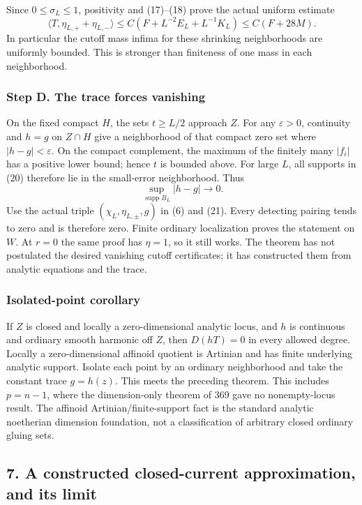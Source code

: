 \documentclass[11pt]{article}
\begin{document}
Since \(0\leq\sigma_L\leq1\), positivity and (17)--(18) prove the actual uniform estimate
\[
 \langle T,\eta_{L,+}+\eta_{L,-}\rangle
 \leq C(F+L^{-2}E_L+L^{-1}K_L)
 \leq C(F+28M).
\tag{21}
\]
In particular the cutoff mass infima for these shrinking neighborhoods are uniformly bounded. This is stronger than finiteness of one mass in each neighborhood.

\subsubsection{Step D. The trace forces vanishing}

On the fixed compact \(H\), the sets \(t\geq L/2\) approach \(Z\). For any \(\varepsilon>0\), continuity and \(h=g\) on \(Z\cap H\) give a neighborhood of that compact zero set where \(|h-g|<\varepsilon\). On the compact complement, the maximum of the finitely many \(|f_i|\) has a positive lower bound; hence \(t\) is bounded above. For large \(L\), all supports in (20) therefore lie in the small-error neighborhood. Thus
\[
 \sup_{\operatorname{supp}B_L}|h-g|\longrightarrow0.
\]
Use the actual triple \((\chi_L,\eta_{L,\pm},g)\) in (6) and (21). Every detecting pairing tends to zero and is therefore zero. Finite ordinary localization proves the statement on \(W\). At \(r=0\) the same proof has \(\eta=1\), so it still works. The theorem has not postulated the desired vanishing cutoff certificates; it has constructed them from analytic equations and the trace.

\subsubsection{Isolated-point corollary}

If \(Z\) is closed and locally a zero-dimensional analytic locus, and \(h\) is continuous and ordinary smooth harmonic off \(Z\), then \(D(hT)=0\) in every allowed degree. Locally a zero-dimensional affinoid quotient is Artinian and has finite underlying analytic support. Isolate each point by an ordinary neighborhood and take the constant trace \(g=h(z)\). This meets the preceding theorem. This includes \(p=n-1\), where the dimension-only theorem of 369 gave no nonempty-locus result. The affinoid Artinian/finite-support fact is the standard analytic noetherian dimension foundation, not a classification of arbitrary closed ordinary gluing sets.

\subsection{7. A constructed closed-current approximation, and its limit}
\end{document}
